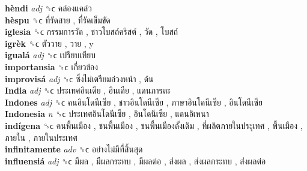 \textbf{hèndi} \emph{adj}  ␝ϲ   คล่องแคล่ว   \\
\textbf{hèspu} ␝ϲ   ที่รัดสาย ,  ที่รัดเข็มขัด   \\
\textbf{iglesia} ␝ϲ   กรรมการวัด ,  ชาวโบสถ์คริสต์ ,  วัด ,  โบสถ์   \\
\textbf{igrèk} ␝ϲ   ตัววาย ,  วาย , y  \\
\textbf{igualá} \emph{adj}  ␝ϲ   เปรียบเทียบ   \\
\textbf{importansia} ␝ϲ   เกี่ยวข้อง   \\
\textbf{improvisá} \emph{adj}  ␝ϲ   ซึ่งไม่เตรียมล่วงหน้า ,  ด้น   \\
\textbf{India} \emph{adj}  ␝ϲ   ประเทศอินเดีย ,  อินเดีย ,  แดนภารตะ   \\
\textbf{Indones} \emph{adj}  ␝ϲ   คนอินโดนีเซีย ,  ชาวอินโดนีเซีย ,  ภาษาอินโดนีเซีย ,  อินโดนีเซีย   \\
\textbf{Indonesia} \emph{n}  ␝ϲ   ประเทศอินโดนีเซีย ,  อินโดนีเซีย ,  แดนอิเหนา   \\
\textbf{indígena} ␝ϲ   คนพื้นเมือง ,  ชนพื้นเมือง ,  ชนพื้นเมืองดั้งเดิม ,  ที่ผลิตภายในประุเทศ ,  พื้นเมือง ,  ภายใน ,  ภายในประเทศ   \\
\textbf{infinitamente} \emph{adv}  ␝ϲ   อย่างไม่มีที่สิ้นสุด   \\
\textbf{influensiá} \emph{adj}  ␝ϲ   มีผล ,  มีผลกระทบ ,  มีผลต่อ ,  ส่งผล ,  ส่งผลกระทบ ,  ส่งผลต่อ   \\
